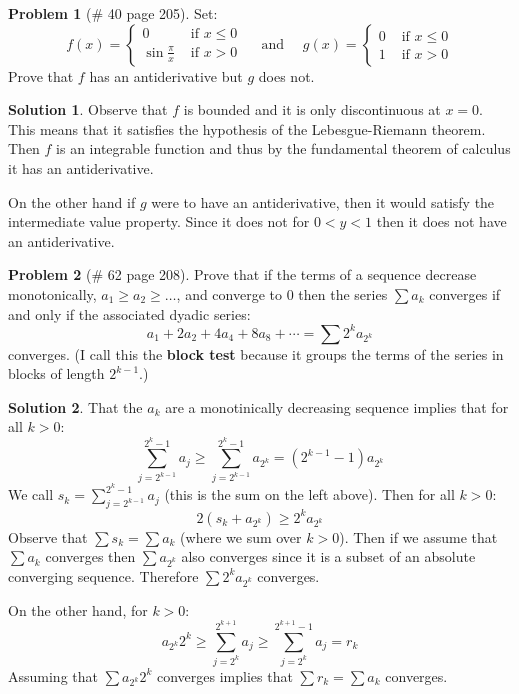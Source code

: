 \documentclass{article}
\theoremstyle{definition}
\newtheorem*{soln}{Solution}
\newtheorem*{prob}{Problem}
\theoremstyle{theorem}
\begin{document}
\begin{prob}[\# 40  page 205]
    Set:
    $$ f(x) = \begin{cases} 0 & \text{ if } x\leq 0\\
    \sin\frac \pi x & \text{ if } x>0\end{cases}\quad \text{ and }\quad g(x) =\begin{cases} 0 & \text{ if } x\leq 0\\
    1 & \text{ if } x>0\end{cases}  $$ 
    Prove that $f$ has an antiderivative but $g$ does not.
\end{prob}
\begin{soln}
    Observe that $f$ is bounded and it is only discontinuous at $x=0$. This means that it satisfies the hypothesis of the Lebesgue-Riemann theorem. Then $f$ is an integrable function and thus by the fundamental theorem of calculus it has an antiderivative. 

    On the other hand if $g$ were to have an antiderivative, then it would satisfy the intermediate value property. Since it does not for $0<y<1$ then it does not have an antiderivative.
\end{soln}
\vspace{1in}



\begin{prob}[\# 62  page 208]
    Prove that if the terms of a sequence decrease monotonically, $a_1 \geq a_2\geq \ldots$, and converge to 0 then the series $\sum a_k$ converges if and only if the associated dyadic series:
    $$a_1 + 2a_2 +4a_4 +8a_8 + \cdots = \sum 2^k a_{2^k }$$
    converges. (I call this the \textbf{block test} because it groups the terms of the series in blocks of length $2^{k-1 }$.)
\end{prob}
\begin{soln}
    That the $a_k$ are a monotinically decreasing sequence implies that for all $k>0$:
    $$ \sum_{j= 2^{k-1 }}^{2^k-1 }a_j \geq \sum_{j=2^{k-1 } }^{2^k-1 }a_{2^k } = (2^{k-1 }-1)a_{2^k }$$
    We call $s_k=\sum_{j= 2^{k-1 }}^{2^k-1 }a_j$ (this is the sum on the left above). Then for all $k>0$:
    $$2(s_k + a_{2^k }) \geq 2^ka_{2^k }$$
    Observe that $\sum s_k = \sum a_k$ (where we sum over $k>0$). Then if we assume that $\sum a_k$ converges then $\sum a_{2^k }$ also converges since it is a subset of an absolute converging sequence. Therefore  $\sum 2^k a_{2^k }$ converges.

    On the other hand, for $k >0$:
    $$a_{2^k }2^k \geq \sum_{j=2^k }^{2^{k+1 } }a_j \geq \sum_{j=2^k }^{2^{k+1 }-1 }a_j = r_k $$
    Assuming that $\sum a_{2^k }2^k $ converges implies that $\sum r_k = \sum a_k$ converges.
\end{soln}
\vspace{1in}
\end{document}

